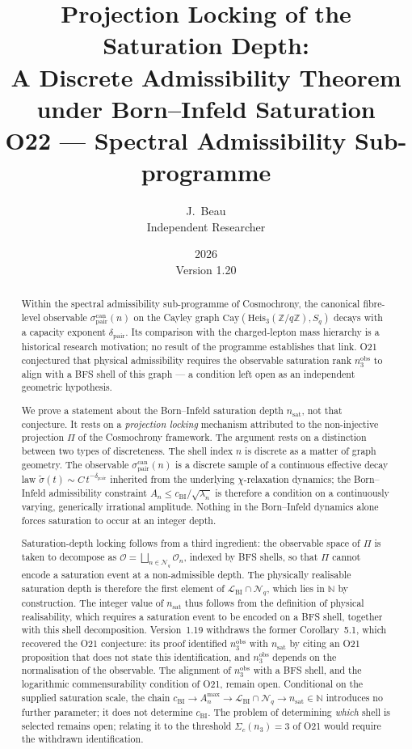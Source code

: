 \documentclass[12pt,a4paper]{article}
\title{Projection Locking of the Saturation Depth:\\
A Discrete Admissibility Theorem under Born--Infeld Saturation\\
\medskip
\large O22 --- Spectral Admissibility Sub-programme}
\author{J.~Beau\\Independent Researcher}
\date{2026\\[2pt]\small Version 1.20}
\theoremstyle{remark}
\newcommand{\cchi}{c_{\mathrm{BI}}}
\newcommand{\sigpair}{\sigma^{\mathrm{can}}_{\mathrm{pair}}}
\newcommand{\nsat}{n_{\mathrm{sat}}}
\newcommand{\nobs}{n^{\mathrm{obs}}_3}
\newcommand{\dpair}{\delta_{\mathrm{pair}}}
\begin{document}
  \maketitle

  \begin{abstract}
    Within the spectral admissibility sub-programme of Cosmochrony, the canonical
    fibre-level observable $\sigpair(n)$ on the Cayley graph
    $\mathrm{Cay}(\mathrm{Heis}_3(\mathbb{Z}/q\mathbb{Z}), S_q)$ decays with a
    capacity exponent $\dpair$.
    Its comparison with the charged-lepton mass hierarchy is a historical research
    motivation; no result of the programme establishes that link.
    O21 conjectured that physical admissibility requires the observable saturation
    rank $\nobs$ to align with a BFS shell of this graph --- a condition left open
    as an independent geometric hypothesis.

    We prove a statement about the Born--Infeld saturation depth $\nsat$, not that
    conjecture.
    It rests on a \emph{projection locking} mechanism attributed to the
    non-injective projection $\Pi$ of the Cosmochrony framework.
    The argument rests on a distinction between two types of discreteness.
    The shell index $n$ is discrete as a matter of graph geometry.
    The observable $\sigpair(n)$ is a discrete sample of a continuous effective decay law
    $\tilde{\sigma}(t) \sim C\,t^{-\dpair}$ inherited from the underlying $\chi$-relaxation
    dynamics; the Born--Infeld admissibility constraint $A_n \leq \cchi/\sqrt{\lambda_n}$
    is therefore a condition on a continuously varying, generically irrational amplitude.
    Nothing in the Born--Infeld dynamics alone forces saturation to occur at an integer
    depth.

    Saturation-depth locking follows from a third ingredient: the observable space of $\Pi$
    is taken to decompose as $\mathcal{O} = \bigsqcup_{n \in \mathcal{N}_q} \mathcal{O}_n$,
    indexed by BFS shells, so that $\Pi$ cannot encode a saturation event at a
    non-admissible depth.
    The physically realisable saturation depth is therefore the first element of
    $\mathcal{L}_{\mathrm{BI}} \cap \mathcal{N}_q$, which lies in $\mathbb{N}$ by
    construction.
    The integer value of $\nsat$ thus follows from the definition of physical realisability,
    which requires a saturation event to be encoded on a BFS shell, together with this
    shell decomposition.
    Version~1.19 withdraws the former Corollary~5.1, which recovered the O21 conjecture:
    its proof identified $\nobs$ with $\nsat$ by citing an O21 proposition that does not
    state this identification, and $\nobs$ depends on the normalisation of the observable.
    The alignment of $\nobs$ with a BFS shell, and the logarithmic commensurability
    condition of O21, remain open.
    Conditional on the supplied saturation scale, the chain
    $\cchi \to A_n^{\max} \to \mathcal{L}_{\mathrm{BI}} \cap \mathcal{N}_q \to
    \nsat \in \mathbb{N}$
    introduces no further parameter; it does not determine $\cchi$.
    The problem of determining \emph{which} shell is selected remains open; relating it
    to the threshold $\Sigma_c(n_3) = 3$ of O21 would require the withdrawn
    identification.
  \end{abstract}
\end{document}
